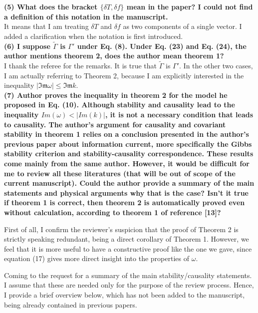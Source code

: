 \documentclass[PRD,onecolumn, nofootinbib]{revtex4-1}
\begin{document}
{\bf (5) What does the bracket $\{\delta T,\delta f\}$ mean in the paper? I could not
find a definition of this notation in the manuscript.}\\

It means that I am treating $\delta T$ and $\delta f$ as two components of a single vector. I added a clarification when the notation is first introduced.\\


{\bf (6) I suppose $\tilde{\Gamma}$ is $\Gamma'$ under Eq. (8). Under Eq. (23) and Eq.
(24), the author mentions theorem 2, does the author mean theorem 1?}\\

I thank the referee for the remarks. It is true that $\tilde{\Gamma}$ is $\Gamma'$. In the other two cases, I am actually referring to Theorem 2, because I am explicitly interested in the inequality $|\mathfrak{Im}\omega|\leq \mathfrak{Im} k$.\\ 

{\bf (7) Author proves the inequality in theorem 2 for the model he proposed in Eq.
(10). Although stability and causality lead to the inequality
$Im(\omega)<|Im(k)|$, it is not a necessary condition that leads to causality. The
author's argument for causality and covariant stability in theorem 1 relies on a
conclusion presented in the author's previous paper about information current,
more specifically the Gibbs stability criterion and stability-causality
correspondence. These results come mainly from the same author. However, it
would be difficult for me to review all these literatures (that will be out of
scope of the current manuscript). Could the author provide a summary of the main
statements and physical arguments why that is the case? Isn't it true if theorem
1 is correct, then theorem 2 is automatically proved even without calculation,
according to theorem 1 of reference [13]?}\\
 \newpage

First of all, I confirm the reviewer's suspicion that the proof of Theorem 2 is strictly speaking redundant, being a direct corollary of Theorem 1. However, we feel that it is more useful to have a constructive proof like the one we gave, since equation (17) gives more direct insight into the properties of $\omega$. 

Coming to the request for a summary of the main stability/causality statements. I assume that these are needed only for the purpose of the review process. Hence, I provide a brief overview below, which has not been added to the manuscript, being already contained in previous papers.\\
\end{document}
